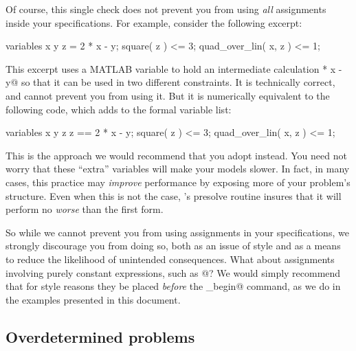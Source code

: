 \documentclass[12pt]{article}
\begin{document}
Of course, this single check does not prevent you from using \emph{all} assignments 
inside your \cvx specifications. For example, consider the following \cvx excerpt:
\begin{code}
	variables x y
	z = 2 * x - y;
	square( z ) <= 3;
	quad_over_lin( x, z ) <= 1;
\end{code}
This excerpt uses a MATLAB variable \verb@z@ to hold an
intermediate calculation  * x - y@ so that it can be used in two different constraints.
It is technically correct, and \cvx cannot prevent you from using it. But it is numerically
equivalent to the following code, which adds \verb@z@ to the formal variable list:
\begin{code}
	variables x y z
	z == 2 * x - y;
	square( z ) <= 3;
	quad_over_lin( x, z ) <= 1;
\end{code}
This is the approach we would recommend that you adopt instead. You need not worry that
these ``extra'' variables will make your models slower. In fact, in many cases, this
practice may \emph{improve} performance by exposing more of your problem's structure.
Even when this is not the case, \cvx's presolve routine insures that it will perform
no \emph{worse} than the first form.

So while we cannot prevent you from using assignments in your \cvx specifications,
we strongly discourage you from doing so, both as an issue of style and
as a means to reduce the likelihood of unintended consequences.
What about assignments involving purely constant expressions, such as @?
We would simply recommend that for style reasons they be placed \emph{before}
the \verb@cvx_begin@ command, as we do in the examples presented in this document.


\subsection{Overdetermined problems}
\label{sec:overdetermined}
\end{document}

